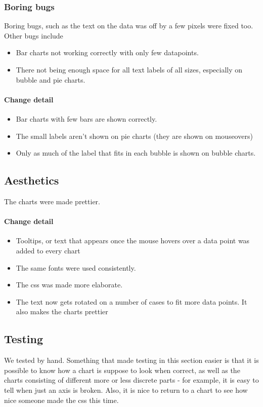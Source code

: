   \subsubsection{Boring bugs}
  Boring bugs, such as the text on the data was off by a few pixels were fixed too.
  Other bugs include 
  \begin{itemize}
  	\item Bar charts not working correctly with only few datapoints.
  	\item There not being enough space for all text labels of all sizes, especially on bubble and pie charts.
  \end{itemize}
  
  \paragraph{Change detail}
  \begin{itemize}
  	\item Bar charts with few bars are shown correctly. 
  	\item The small labels aren't shown on pie charts (they are shown on mouseovers)
  	\item Only as much of the label that fits in each bubble is shown on bubble charts.
\end{itemize}
  

\pagebreak[4]
\subsection{Aesthetics}
The charts were made prettier.
  
\paragraph{Change detail}
\begin{itemize}
  \item Tooltips, or text that appears once the mouse hovers over a data point was added to every chart
  \item The same fonts were used consistently.
  \item The css was made more elaborate.
  \item The text now gets rotated on a number of cases to fit more data points. It also makes the charts prettier
\end{itemize}

  
\subsection{Testing}
 We tested by hand. Something that made testing in this section easier is that it is possible to know
 how a chart is suppose to look when correct, as well as the charts consisting of different more or less discrete
 parts - for example, it is easy to tell when just an axis is broken.
 Also, it is nice to return to a chart to see how nice someone made the css this time. 
 
